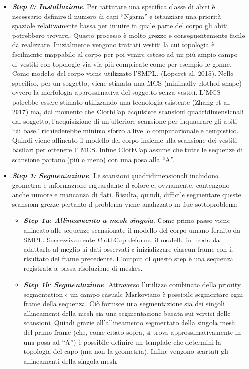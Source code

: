 \begin{itemize}
    \item \textbf{\textit{Step 0: Installazione}}. Per catturare una specifica classe di abiti è necessario definire il numero di capi “Ngarm”  e istanziare una priorità spaziale relativamente bassa per intuire in quale parte del corpo gli abiti potrebbero trovarsi. Questo processo è molto grezzo e conseguentemente facile da realizzare. Inizialmente vengono trattati vestiti la cui topologia è facilmente mappabile al corpo per poi venire esteso ad un più ampio campo di vestiti con topologie via via più complicate come per esempio le gonne.
    Come modello del corpo viene utilizzato l’SMPL. (Loperet al. 2015).
    Nello specifico, per un soggetto, viene stimata una MCS (minimally clothed shape) ovvero la morfologia approssimativa del soggetto senza vestiti.
    L’MCS potrebbe essere stimato utilizzando una tecnologia esistente (Zhang et al. 2017) ma, dal momento che ClothCap acquisisce scansioni quadridimensionali dal soggetto, l’acquisizione di un’ulteriore scansione per inquadrare gli abiti “di base” richiederebbe minimo sforzo a livello computazionale e tempistico. Quindi viene allineato il modello del corpo insieme alla scansione dei vestiti basilari per ottenere l’ MCS. Infine ClothCap assume che tutte le sequenze di scansione partano (più o meno) con una posa alla “A”.
    \item \textbf{\textit{Step 1: Segmentazione}}.
    Le scansioni quadridimensionali includono geometria e informazione riguardante il colore e, ovviamente, contengono anche rumore e mancanza di dati. Risulta, quindi, difficile segmentare queste scansioni grezze pertanto il problema viene analizzato in due sottoproblemi:
    \begin{itemize}
        \item \textbf{\textit{Step 1a: Allineamento a mesh singola}}. Come primo passo viene allineato alle sequenze scansionate il modello del corpo umano fornito da SMPL. Successivamente ClothCap deforma il modello in modo da adattarlo al meglio ai dati osservati e inizializzare ciascun frame con il risultato del frame precedente. L’output di questo step è una sequenza registrata a bassa risoluzione di meshes.
        \item \textbf{\textit{Step 1b: Segmentazione}}. Attraverso l’utilizzo combinato della priority segmentation e un campo casuale Markoviano è possibile segmentare ogni frame della sequenza. Ciò fornisce una segmentazione sia dei singoli allineamenti della mesh sia una segmentazione basata sui vertici delle scansioni. Quindi grazie all’allineamento segmentato della singola mesh del primo frame (che, come citato sopra, si trova approssimativamente in una posa ad “A”) è possibile definire un template che determini la topologia del capo (ma non la geometria). Infine vengono scartati gli allineamenti della singola mesh.
        

\end{itemize}
\end{itemize}
